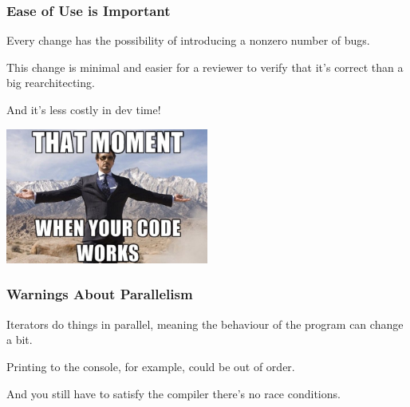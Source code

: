 \begin{frame}
\frametitle{Ease of Use is Important}

Every change has the possibility of introducing a nonzero number of bugs. 

This change is minimal and easier for a reviewer to verify that it's correct than a big rearchitecting. 

And it's less costly in dev time!

\begin{center}
	\includegraphics[width=0.5\textwidth]{images/codeworks.jpg}
\end{center}


\end{frame}

\begin{frame}
\frametitle{Warnings About Parallelism}

Iterators do things in parallel, meaning the behaviour of the program can change a bit. 

Printing to the console, for example, could be out of order.

And you still have to satisfy the compiler there's no race conditions.

\end{frame}

